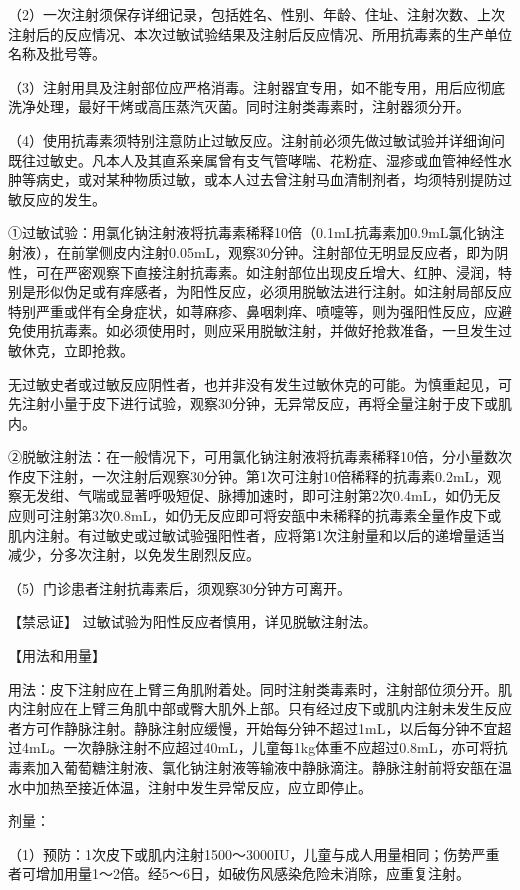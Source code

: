 （2）一次注射须保存详细记录，包括姓名、性别、年龄、住址、注射次数、上次注射后的反应情况、本次过敏试验结果及注射后反应情况、所用抗毒素的生产单位名称及批号等。

（3）注射用具及注射部位应严格消毒。注射器宜专用，如不能专用，用后应彻底洗净处理，最好干烤或高压蒸汽灭菌。同时注射类毒素时，注射器须分开。

（4）使用抗毒素须特别注意防止过敏反应。注射前必须先做过敏试验并详细询问既往过敏史。凡本人及其直系亲属曾有支气管哮喘、花粉症、湿疹或血管神经性水肿等病史，或对某种物质过敏，或本人过去曾注射马血清制剂者，均须特别提防过敏反应的发生。

①过敏试验：用氯化钠注射液将抗毒素稀释10倍（0.1mL抗毒素加0.9mL氯化钠注射液），在前掌侧皮内注射0.05mL，观察30分钟。注射部位无明显反应者，即为阴性，可在严密观察下直接注射抗毒素。如注射部位出现皮丘增大、红肿、浸润，特别是形似伪足或有痒感者，为阳性反应，必须用脱敏法进行注射。如注射局部反应特别严重或伴有全身症状，如荨麻疹、鼻咽刺痒、喷嚏等，则为强阳性反应，应避免使用抗毒素。如必须使用时，则应采用脱敏注射，并做好抢救准备，一旦发生过敏休克，立即抢救。

无过敏史者或过敏反应阴性者，也并非没有发生过敏休克的可能。为慎重起见，可先注射小量于皮下进行试验，观察30分钟，无异常反应，再将全量注射于皮下或肌内。

②脱敏注射法：在一般情况下，可用氯化钠注射液将抗毒素稀释10倍，分小量数次作皮下注射，一次注射后观察30分钟。第1次可注射10倍稀释的抗毒素0.2mL，观察无发绀、气喘或显著呼吸短促、脉搏加速时，即可注射第2次0.4mL，如仍无反应则可注射第3次0.8mL，如仍无反应即可将安瓿中未稀释的抗毒素全量作皮下或肌内注射。有过敏史或过敏试验强阳性者，应将第1次注射量和以后的递增量适当减少，分多次注射，以免发生剧烈反应。

（5）门诊患者注射抗毒素后，须观察30分钟方可离开。

【禁忌证】 过敏试验为阳性反应者慎用，详见脱敏注射法。

【用法和用量】

用法：皮下注射应在上臂三角肌附着处。同时注射类毒素时，注射部位须分开。肌内注射应在上臂三角肌中部或臀大肌外上部。只有经过皮下或肌内注射未发生反应者方可作静脉注射。静脉注射应缓慢，开始每分钟不超过1mL，以后每分钟不宜超过4mL。一次静脉注射不应超过40mL，儿童每1kg体重不应超过0.8mL，亦可将抗毒素加入葡萄糖注射液、氯化钠注射液等输液中静脉滴注。静脉注射前将安瓿在温水中加热至接近体温，注射中发生异常反应，应立即停止。

剂量：

（1）预防：1次皮下或肌内注射1500～3000IU，儿童与成人用量相同；伤势严重者可增加用量1～2倍。经5～6日，如破伤风感染危险未消除，应重复注射。

